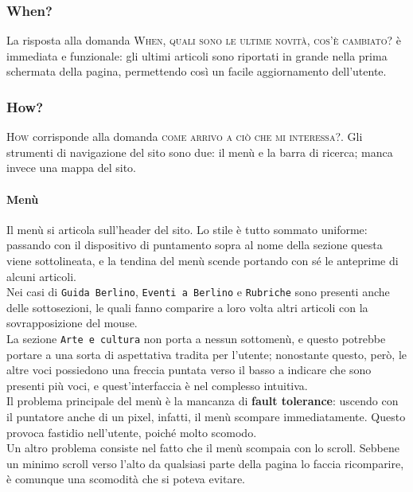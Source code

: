 \subsubsection{When?}
La risposta alla domanda \textsc{When}, \textsc{quali sono le ultime novità, cos'è cambiato?} è immediata e funzionale: gli ultimi articoli sono riportati in grande nella prima schermata della pagina, permettendo così un facile aggiornamento dell'utente.

\subsubsection{How?}
\textsc{How} corrisponde alla domanda \textsc{come arrivo a ciò che mi interessa?}. Gli strumenti di navigazione del sito sono due: il menù e la barra di ricerca; manca invece una mappa del sito.

\paragraph*{Menù}

Il menù si articola sull'header del sito. Lo stile è tutto sommato uniforme: passando con il dispositivo di puntamento sopra al nome della sezione questa viene sottolineata, e la tendina del menù scende portando con sé le anteprime di alcuni articoli. \\
Nei casi di \texttt{Guida Berlino}, \texttt{Eventi a Berlino} e \texttt{Rubriche} sono presenti anche delle sottosezioni, le quali fanno comparire a loro volta altri articoli con la sovrapposizione del mouse. \\
La sezione \texttt{Arte e cultura} non porta a nessun sottomenù, e questo potrebbe portare a una sorta di aspettativa tradita per l'utente; nonostante questo, però, le altre voci possiedono una freccia puntata verso il basso a indicare che sono presenti più voci, e quest'interfaccia è nel complesso intuitiva. \\
Il problema principale del menù è la mancanza di \textbf{fault tolerance}: uscendo con il puntatore anche di un pixel, infatti, il menù scompare immediatamente. Questo provoca fastidio nell'utente, poiché molto scomodo. \\
Un altro problema consiste nel fatto che il menù scompaia con lo scroll. Sebbene un minimo scroll verso l'alto da qualsiasi parte della pagina lo faccia ricomparire, è comunque una scomodità che si poteva evitare.

